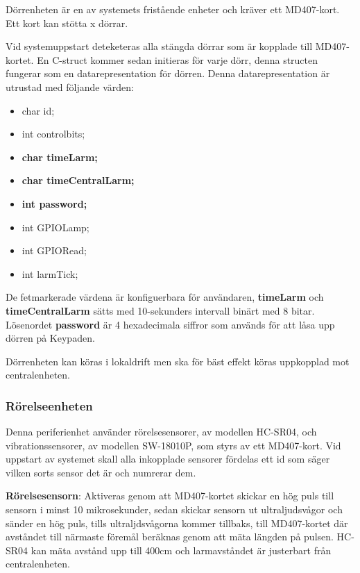\documentclass{article}
\begin{document}
Dörrenheten är en av systemets fristående enheter och kräver ett MD407-kort. Ett kort kan stötta x dörrar.

Vid systemuppstart deteketeras alla stängda dörrar som är kopplade till MD407-kortet. En C-struct kommer sedan initieras för varje dörr, denna structen fungerar som en datarepresentation för dörren. Denna datarepresentation är utrustad med följande värden:
\begin{itemize}
  \item {char id;}
  \item {int controlbits;}
  \item \textbf{char time\textunderscore{}Larm;}
  \item \textbf{char time\textunderscore{}Central\textunderscore{}Larm;}
  \item \textbf{int password;}
  \item int GPIO\textunderscore{}Lamp;
  \item int GPIO\textunderscore{}Read;
  \item int larmTick;
\end{itemize}

De fetmarkerade värdena är konfiguerbara för användaren, \textbf{time\textunderscore{}Larm} och \\ \textbf{time\textunderscore{}Central\textunderscore{}Larm} sätts med 10-sekunders intervall binärt med 8 bitar. Lösenordet \textbf{password} är 4 hexadecimala siffror som används för att låsa upp dörren på Keypaden.

Dörrenheten kan köras i lokaldrift
men ska för bäst effekt köras uppkopplad mot centralenheten.\\
\subsubsection{Rörelseenheten}
Denna periferienhet använder rörelsesensorer, av modellen HC-SR04, och vibrationssensorer, av modellen SW-18010P, som styrs av ett MD407-kort.
Vid uppstart av systemet skall alla inkopplade sensorer fördelas ett id som säger vilken sorts sensor det är och numrerar dem.

\textbf{Rörelsesensorn}: Aktiveras genom att MD407-kortet skickar en hög puls till sensorn i minst 10 mikrosekunder, 
sedan skickar sensorn ut ultraljudsvågor och sänder en hög puls, tills ultraljdsvågorna kommer tillbaks,  
till MD407-kortet där avståndet till närmaste föremål beräknas genom att mäta längden på pulsen. 
HC-SR04 kan mäta avstånd upp till 400cm och larmavståndet är justerbart från centralenheten.
\end{document}
